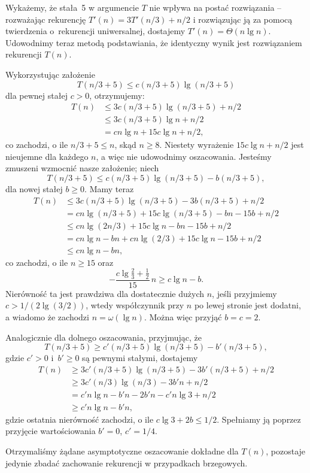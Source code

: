 \subexercise{} %
Wykażemy, że stała~5 w argumencie $T$ nie wpływa na postać rozwiązania -- rozważając rekurencję $T'(n)=3T'(n/3)+n/2$ i rozwiązując ją za pomocą twierdzenia o~rekurencji uniwersalnej, dostajemy $T'(n)=\Theta(n\lg n)$. Udowodnimy teraz metodą podstawiania, że identyczny wynik jest rozwiązaniem rekurencji $T(n)$.

Wykorzystując założenie
\[
	T(n/3+5) \le c(n/3+5)\lg(n/3+5)
\]
dla pewnej stałej $c>0$, otrzymujemy:
\begin{align*}
	T(n) &\le 3c(n/3+5)\lg(n/3+5)+n/2 \\
	&\le 3c(n/3+5)\lg n+n/2 \\
	&= cn\lg n+15c\lg n+n/2,
\end{align*}
co zachodzi, o ile $n/3+5\le n$, skąd $n\ge8$. Niestety wyrażenie $15c\lg n+n/2$ jest nieujemne dla każdego $n$, a więc nie udowodnimy oszacowania. Jesteśmy zmuszeni wzmocnić nasze założenie; niech
\[
	T(n/3+5) \le c(n/3+5)\lg(n/3+5)-b(n/3+5),
\]
dla nowej stałej $b\ge0$. Mamy teraz
\begin{align*}
	T(n) &\le 3c(n/3+5)\lg(n/3+5)-3b(n/3+5)+n/2 \\
	&= cn\lg(n/3+5)+15c\lg(n/3+5)-bn-15b+n/2 \\
	&\le cn\lg(2n/3)+15c\lg n-bn-15b+n/2 \\
	&= cn\lg n-bn+cn\lg(2/3)+15c\lg n-15b+n/2 \\
	&\le cn\lg n-bn,
\end{align*}
co zachodzi, o ile $n\ge15$ oraz
\[
	-\frac{c\lg\frac{2}{3}+\frac{1}{2}}{15}\,n \ge c\lg n-b.
\]
Nierówność ta jest prawdziwa dla dostatecznie dużych $n$, jeśli przyjmiemy $c>1/(2\lg(3/2))$, wtedy współczynnik przy $n$ po lewej stronie jest dodatni, a wiadomo że zachodzi $n=\omega(\lg n)$. Można więc przyjąć $b=c=2$.

Analogicznie dla dolnego oszacowania, przyjmując, że
\[
	T(n/3+5) \ge c'(n/3+5)\lg(n/3+5)-b'(n/3+5),
\]
gdzie $c'>0$ i~$b'\ge0$ są pewnymi stałymi, dostajemy
\begin{align*}
	T(n) &\ge 3c'(n/3+5)\lg(n/3+5)-3b'(n/3+5)+n/2 \\
	&\ge 3c'(n/3)\lg(n/3)-3b'n+n/2 \\
	&= c'n\lg n-b'n-2b'n-c'n\lg3+n/2 \\
	&\ge c'n\lg n-b'n,
\end{align*}
gdzie ostatnia nierówność zachodzi, o ile $c\lg3+2b\le1/2$. Spełniamy ją poprzez przyjęcie wartościowania $b'=0$, $c'=1/4$.

Otrzymaliśmy żądane asymptotyczne oszacowanie dokładne dla $T(n)$, pozostaje jedynie zbadać zachowanie rekurencji w przypadkach brzegowych.

